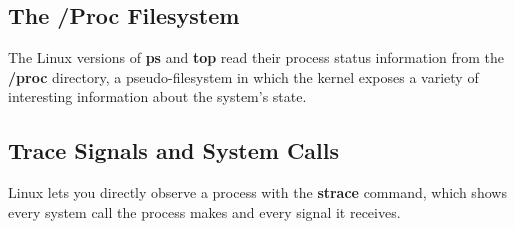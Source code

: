 \documentclass[10pt,letterpaper]{book}
\begin{document}
\subsection{The /Proc Filesystem}
The Linux versions of \textbf{ps} and \textbf{top} read their process status information from the \textbf{/proc} directory, a pseudo-filesystem in which the kernel exposes a variety of interesting information about the system's state.
\subsection{Trace Signals and System Calls}
Linux lets you directly observe a process with the \textbf{strace} command, which shows every system call the process makes and every signal it receives.
\end{document}
